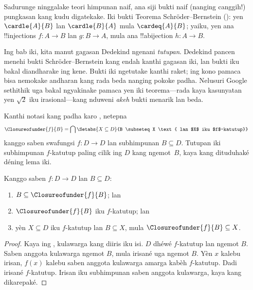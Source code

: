 \documentclass[../../../include/open-logic-section]{subfiles}
\begin{document}


Sadurunge ninggalake teori himpunan naif, ana siji bukti naif
(nanging canggih!) pungkasan kang kudu digatekake. Iki bukti Teorema
Schr\"oder--Bernstein ():
yen $\cardle{A}{B}$ lan $\cardle{B}{A}$ mula $\cardeq{A}{B}$; yaiku,
yen ana !!{injection}s $f \colon A \to B$ lan $g \colon B \to A$, mula
ana !!a{bijection} $h \colon A \to B$.

Ing bab iki, kita manut gagasan Dedekind ngenani \emph{tutupan}.
Dedekind pancen menehi bukti Schr\"oder--Bernstein kang endah kanthi
gagasan iki, lan bukti iku bakal diandharake ing kene. Bukti iki
ngetutake \citet[kaca~157--8]{Potter2004} kanthi raket; ing kono pamaca
bisa nemokake andharan kang rada beda nanging pokoke padha. Nelusuri
Google sethithik uga bakal ngyakinake pamaca yen iki teorema---rada kaya
kasunyatan yen $\sqrt{2}$ iku irasional---kang nduweni \emph{akeh}
bukti menarik lan beda.

Kanthi notasi kang padha karo
, netepna
\[
\Closureofunder{f}{B} = \bigcap \Setabs{X\subseteq D}{B \subseteq X
\text{ lan $X$ iku $f$-katutup}}
\]
kanggo saben swafungsi $f\colon D\to D$ lan subhimpunan $B\subseteq D$.
Tutupan iki subhimpunan $f$-katutup paling cilik ing $D$ kang
ngemot~$B$, kaya kang dituduhaké déning lema iki.

\begin{lem}
	Kanggo saben $f\colon D\to D$ lan $B\subseteq D$:
	\begin{enumerate}
		\item{} $B \subseteq \Closureofunder{f}{B}$; lan
		\item{} $\Closureofunder{f}{B}$ iku $f$-katutup; lan
		\item{} yèn $X\subseteq D$ iku $f$-katutup lan $B
		\subseteq X$, mula $\Closureofunder{f}{B} \subseteq X$.
	\end{enumerate}
\end{lem}

\begin{proof}
Kaya ing , kulawarga
kang diiris iku isi. $D$ dhéwé $f$-katutup lan ngemot $B$. Saben
anggota kulawarga ngemot $B$, mula irisané uga ngemot $B$. Yèn
$x$ kalebu irisan, $f(x)$ kalebu saben anggota kulawarga amarga
kabèh $f$-katutup. Dadi irisané $f$-katutup. Irisan iku subhimpunan
saben anggota kulawarga, kaya kang dikarepaké.
\end{proof}
\end{document}
